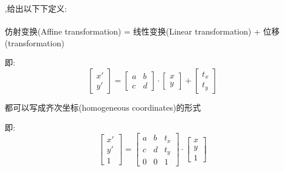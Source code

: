 {{{      {,给出以下下定义:}\\\\\indent
      仿射变换(Affine transformation) = 线性变换(Linear transformation) + 位移(transformation)

      即:
      $$\begin{bmatrix}
          x\prime \\
          y\prime
        \end{bmatrix}
        =
        \begin{bmatrix}
          a & b \\
          c & d
        \end{bmatrix}
        \cdot
        \begin{bmatrix}
          x \\
          y
        \end{bmatrix}
        +
        \begin{bmatrix}
          t_x \\
          t_y
        \end{bmatrix}$$

      都可以写成齐次坐标(homogeneous coordinates)的形式

      即:
      $$\begin{bmatrix}
          x\prime \\
          y\prime \\
          1
        \end{bmatrix}
        =
        \begin{bmatrix}
          a & b & t_x \\
          c & d & t_y \\
          0 & 0 & 1
        \end{bmatrix}
        \cdot
        \begin{bmatrix}
          x \\
          y \\
          1
        \end{bmatrix}$$

}}}
